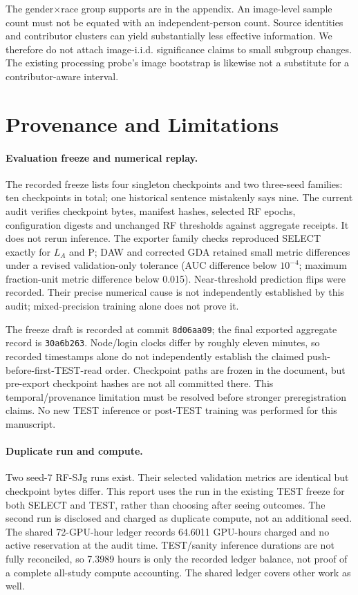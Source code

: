 \documentclass[10pt,twocolumn,letterpaper]{article}
\begin{document}
The gender$\times$race group supports are in the appendix. An image-level sample count must not be equated
with an independent-person count. Source identities and contributor clusters can yield substantially less
effective information. We therefore do not attach image-i.i.d. significance claims to small subgroup changes.
The existing processing probe's image bootstrap is likewise not a substitute for a contributor-aware interval.

\section{Provenance and Limitations}
\paragraph{Evaluation freeze and numerical replay.}
The recorded freeze lists four singleton checkpoints and two three-seed families: ten checkpoints in total;
one historical sentence mistakenly says nine. The current audit verifies checkpoint bytes, manifest hashes,
selected RF epochs, configuration digests and unchanged RF thresholds against aggregate receipts.
It does not rerun inference. The exporter family checks reproduced SELECT exactly for $L_A$ and P;
DAW and corrected GDA retained small metric differences under a revised validation-only tolerance
(AUC difference below $10^{-4}$; maximum fraction-unit metric difference below 0.015).
Near-threshold prediction flips were recorded. Their precise numerical cause is not independently established
by this audit; mixed-precision training alone does not prove it.

The freeze draft is recorded at commit \texttt{8d06aa09}; the final exported aggregate record is
\texttt{30a6b263}. Node/login clocks differ by roughly eleven minutes, so recorded timestamps alone do not
independently establish the claimed push-before-first-TEST-read order. Checkpoint paths are frozen in the
document, but pre-export checkpoint hashes are not all committed there. This temporal/provenance limitation
must be resolved before stronger preregistration claims. No new TEST inference or post-TEST training was
performed for this manuscript.

\paragraph{Duplicate run and compute.}
Two seed-7 RF-SJg runs exist. Their selected validation metrics are identical but checkpoint bytes differ.
This report uses the run in the existing TEST freeze for both SELECT and TEST, rather than choosing after
seeing outcomes. The second run is disclosed and charged as duplicate compute, not an additional seed.
The shared 72-GPU-hour ledger records 64.6011 GPU-hours charged and no active reservation at the audit time.
TEST/sanity inference durations are not fully reconciled, so 7.3989 hours is only the recorded ledger balance,
not proof of a complete all-study compute accounting. The shared ledger covers other work as well.
\end{document}
